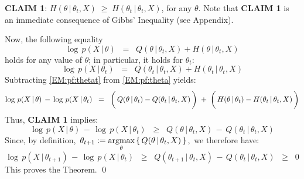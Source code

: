 \vskip 0.5cm
\noindent
\textbf{CLAIM 1}:\;\; $H(\theta\,|\,\theta_{t},X) \;\geq\; H(\theta_{t}\,|\,\theta_{t},X)$,\;\; for any $\theta$.
\vskip 0.3cm
\noindent
Note that \textbf{CLAIM 1} is an immediate consequence of Gibbs' Inequality (see Appendix).

\vskip 0.3cm
\noindent
Now, the following equality
\begin{equation}
\label{EM:pf:theta}
\log\,p(X\,|\,\theta)
\;\; = \;\;
	Q(\theta\,|\,\theta_{t},X) + H(\theta\,|\,\theta_{t},X)
\end{equation}
holds for any value of $\theta$; in particular, it holds for $\theta_{t}$:
\begin{equation}
\label{EM:pf:thetat}
\log\,p(X\,|\,\theta_{t})
\;\; = \;\;
Q(\theta_{t}\,|\,\theta_{t},X) + H(\theta_{t}\,|\,\theta_{t},X)
\end{equation}
Subtracting \eqref{EM:pf:thetat} from \eqref{EM:pf:theta} yields:
\begin{equation}
\log\,p(X\,|\,\theta) \,-\, \log\,p(X\,|\,\theta_{t})
\;\; = \;\;
\left(\,Q(\theta\,|\,\theta_{t}) \overset{{\color{white}\vert}}{-} Q(\theta_{t}\,|\,\theta_{t},X)\,\right)
\;+\;
\left(\,H(\theta\,|\,\theta_{t}) \overset{{\color{white}\vert}}{-} H(\theta_{t}\,|\,\theta_{t},X)\,\right)
\end{equation}
Thus, \textbf{CLAIM 1} implies:
\begin{equation}
\log\,p(X\,|\,\theta) \,-\, \log\,p(X\,|\,\theta_{t})
\;\; \geq \;\;
Q(\theta\,|\,\theta_{t},X) \,-\, Q(\theta_{t}\,|\,\theta_{t},X)
\end{equation}
Since, by definition,
\,$\theta_{t+1} := \underset{\theta}{\textnormal{argmax}}\left\{\,Q(\theta\,|\,\theta_{t},X)\,\right\}$,\,
we therefore have:
\begin{equation}
\log\,p(X\,|\,\theta_{t+1}) \,-\, \log\,p(X\,|\,\theta_{t})
\;\; \geq \;\;
Q(\theta_{t+1}\,|\,\theta_{t},X) \,-\, Q(\theta_{t}\,|\,\theta_{t},X)
\;\; \geq \;\;
0
\end{equation}
This proves the Theorem.  \qed


